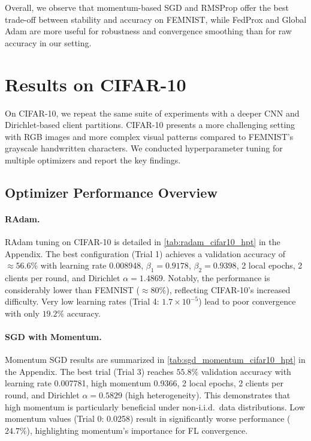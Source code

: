 \documentclass[10pt,twocolumn,letterpaper]{article}
\begin{document}
    Overall, we observe that momentum-based SGD and RMSProp offer the best
    trade-off between stability and accuracy on FEMNIST, while FedProx and
    Global Adam are more useful for robustness and convergence smoothing
    than for raw accuracy in our setting.

    \section{Results on CIFAR-10}
    \label{sec:results_cifar}

    On CIFAR-10, we repeat the same suite of experiments with a deeper CNN
    and Dirichlet-based client partitions.
    CIFAR-10 presents a more challenging setting with RGB images and more
    complex visual patterns compared to FEMNIST's grayscale handwritten
    characters.
    We conducted hyperparameter tuning for multiple optimizers and report
    the key findings.

    \subsection{Optimizer Performance Overview}

    \paragraph{RAdam.}
    RAdam tuning on CIFAR-10 is detailed in \cref{tab:radam_cifar10_hpt} in
    the Appendix.
    The best configuration (Trial 1) achieves a validation accuracy of
    $\approx 56.6\%$ with learning rate 0.008948, $\beta_1=0.9178$,
    $\beta_2=0.9398$, 2 local epochs, 2 clients per round, and Dirichlet
    $\alpha=1.4869$.
    Notably, the performance is considerably lower than FEMNIST
    ($\approx 80\%$), reflecting CIFAR-10's increased difficulty.
    Very low learning rates (Trial 4: $1.7 \times 10^{-5}$) lead to poor
    convergence with only $19.2\%$ accuracy.

    \paragraph{SGD with Momentum.}
    Momentum SGD results are summarized in \cref{tab:sgd_momentum_cifar10_hpt}
    in the Appendix.
    The best trial (Trial 3) reaches $55.8\%$ validation accuracy with
    learning rate 0.007781, high momentum 0.9366, 2 local epochs, 2 clients
    per round, and Dirichlet $\alpha=0.5829$ (high heterogeneity).
    This demonstrates that high momentum is particularly beneficial under
    non-i.i.d.\ data distributions.
    Low momentum values (Trial 0: 0.0258) result in significantly worse
    performance ($24.7\%$), highlighting momentum's importance for FL
    convergence.
\end{document}
